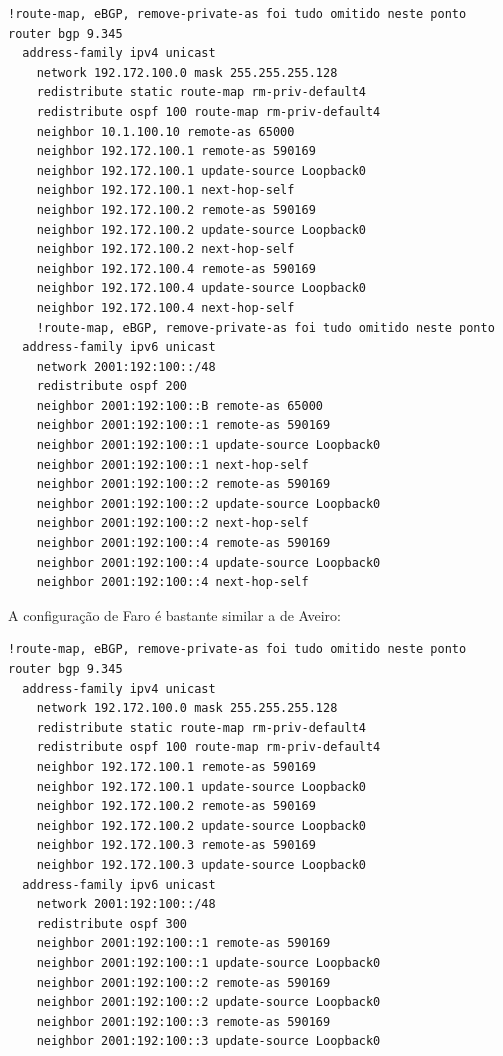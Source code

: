 \documentclass[11pt,a4paper]{report}
\begin{document}
\begin{lstlisting}[caption=Internal BGP  \& OSPF Redistribute - Router Aveiro]
  	!route-map, eBGP, remove-private-as foi tudo omitido neste ponto
router bgp 9.345
  address-family ipv4 unicast
  	network 192.172.100.0 mask 255.255.255.128
  	redistribute static route-map rm-priv-default4
  	redistribute ospf 100 route-map rm-priv-default4
  	neighbor 10.1.100.10 remote-as 65000
    neighbor 192.172.100.1 remote-as 590169
	neighbor 192.172.100.1 update-source Loopback0
 	neighbor 192.172.100.1 next-hop-self
 	neighbor 192.172.100.2 remote-as 590169
 	neighbor 192.172.100.2 update-source Loopback0
 	neighbor 192.172.100.2 next-hop-self
 	neighbor 192.172.100.4 remote-as 590169
 	neighbor 192.172.100.4 update-source Loopback0
  	neighbor 192.172.100.4 next-hop-self
  	!route-map, eBGP, remove-private-as foi tudo omitido neste ponto
  address-family ipv6 unicast
  	network 2001:192:100::/48
  	redistribute ospf 200
  	neighbor 2001:192:100::B remote-as 65000
  	neighbor 2001:192:100::1 remote-as 590169
 	neighbor 2001:192:100::1 update-source Loopback0
 	neighbor 2001:192:100::1 next-hop-self
 	neighbor 2001:192:100::2 remote-as 590169
 	neighbor 2001:192:100::2 update-source Loopback0
 	neighbor 2001:192:100::2 next-hop-self
 	neighbor 2001:192:100::4 remote-as 590169
 	neighbor 2001:192:100::4 update-source Loopback0
 	neighbor 2001:192:100::4 next-hop-self
\end{lstlisting}

A configuração de Faro é bastante similar a de Aveiro:\\

\begin{lstlisting}[caption=Internal BGP  \& OSPF Redistribute - Router Faro]
  	!route-map, eBGP, remove-private-as foi tudo omitido neste ponto
router bgp 9.345
  address-family ipv4 unicast
  	network 192.172.100.0 mask 255.255.255.128
  	redistribute static route-map rm-priv-default4
  	redistribute ospf 100 route-map rm-priv-default4
    neighbor 192.172.100.1 remote-as 590169
	neighbor 192.172.100.1 update-source Loopback0
 	neighbor 192.172.100.2 remote-as 590169
 	neighbor 192.172.100.2 update-source Loopback0
 	neighbor 192.172.100.3 remote-as 590169
 	neighbor 192.172.100.3 update-source Loopback0
  address-family ipv6 unicast
  	network 2001:192:100::/48
  	redistribute ospf 300
  	neighbor 2001:192:100::1 remote-as 590169
 	neighbor 2001:192:100::1 update-source Loopback0
 	neighbor 2001:192:100::2 remote-as 590169
 	neighbor 2001:192:100::2 update-source Loopback0
 	neighbor 2001:192:100::3 remote-as 590169
 	neighbor 2001:192:100::3 update-source Loopback0
\end{lstlisting}
\end{document}
